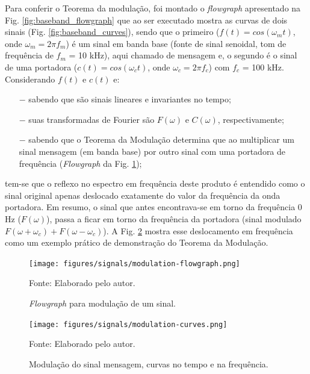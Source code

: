 \documentclass[
  12pt,				%
  openright,			%
  twoside,			%
  a4paper,			%
  english,			%
  french,				%
  spanish,			%
  brazil,				%
  ]{abntex2}
\begin{document}
Para conferir o Teorema da modulação, foi montado o \textit{flowgraph} apresentado na Fig. \ref{fig:baseband_flowgraph} que ao ser executado mostra as curvas de dois sinais (Fig. \ref{fig:baseband_curves}), sendo que o
primeiro ($f(t) = cos(\omega_mt)$, onde $\omega_m = 2 \pi f_m$) é um sinal em banda base (fonte de sinal senoidal, tom de frequência de $f_m$ = 10 kHz), aqui chamado de mensagem e, o segundo é
o sinal de uma portadora ($c(t) = cos(\omega_ct)$, onde $\omega_c = 2 \pi f_c$) com $f_c$ = 100 kHz. Considerando $f(t)$ e $c(t)$ e:

\begin{itemize}
  \item[$-$] sabendo que são sinais lineares e invariantes no tempo;
  \item[$-$] suas transformadas de Fourier são $F(\omega)$ e $C(\omega)$, respectivamente;
  \item[$-$] sabendo que o Teorema da Modulação \cite{Lathi:1998} determina que ao multiplicar um sinal mensagem (em banda base) por outro sinal com uma portadora de frequência (\textit{Flowgraph} da
        Fig. \ref{fig:modulation_flowgraph});
\end{itemize}

tem-se que o reflexo no espectro em frequência deste produto é entendido como o sinal original apenas deslocado exatamente do valor da frequência da onda portadora.
Em resumo, o sinal que antes encontrava-se em torno da frequência 0 Hz ($F(\omega)$), passa a ficar em torno da frequência da portadora (sinal modulado $F(\omega + \omega_c) + F(\omega - \omega_c)$). A
Fig. \ref{fig:modulation_curves} mostra esse deslocamento em frequência como um exemplo prático de demonstração do Teorema da Modulação.

\begin{figure}[!htb]
  \centering
  \caption{\textit{Flowgraph} para modulação de um sinal.}
  \texttt{[image: figures/signals/modulation-flowgraph.png]}

  Fonte: Elaborado pelo autor.
  \label{fig:modulation_flowgraph}
\end{figure}

\begin{figure}[!htb]
  \centering
  \caption{Modulação do sinal mensagem, curvas no tempo e na frequência.}
  \texttt{[image: figures/signals/modulation-curves.png]}

  Fonte: Elaborado pelo autor.
  \label{fig:modulation_curves}
\end{figure}
\end{document}
